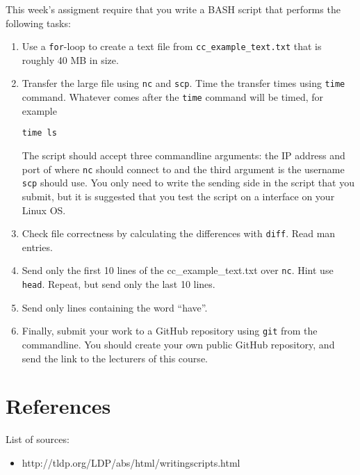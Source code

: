 \documentclass[a4paper]{article}
\begin{document}
This week's assigment require that you write a BASH script that performs the following tasks: 

\begin{enumerate}
\item Use a \texttt{for}-loop to create a text file from \texttt{cc\_example\_text.txt} that is roughly 40 MB in size. 

\item{Transfer the large file using \texttt{nc} and \texttt{scp}. Time the transfer times using \texttt{time} command. Whatever comes after the \texttt{time} command will be timed, for example 
\begin{lstlisting}
time ls
\end{lstlisting}
The script should accept three commandline arguments: the IP address and port of where \texttt{nc} should connect to and the third argument is the username \texttt{scp} should use. You only need to write the sending side in the script that you submit, but it is suggested that you test the script on a interface on your Linux OS. 
}

\item Check file correctness by calculating the differences with \texttt{diff}. Read man entries.

\item Send only the first 10 lines of the cc\_example\_text.txt over \texttt{nc}. Hint use \texttt{head}. Repeat, but send only the last 10 lines. 
\item Send only lines containing the word ``have''. 

\item Finally, submit your work to a GitHub repository using \texttt{git} from the commandline. You should create your own public GitHub repository, and send the link to the lecturers of this course. 

\end{enumerate} 

\section{References}

List of sources:

\begin{itemize}
	
    \item http://tldp.org/LDP/abs/html/writingscripts.html
    
\end{itemize}
\end{document}
